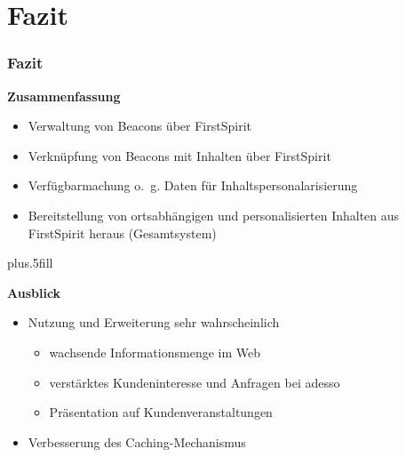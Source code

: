 \documentclass{beamer}
\begin{document}

\section[Fazit]{Fazit}

\begin{frame}
\frametitle<presentation>{Fazit}

{\textbf{Zusammenfassung}}

\begin{itemize}
\item Verwaltung von Beacons über FirstSpirit
\item Verknüpfung von Beacons mit Inhalten über FirstSpirit
\item Verfügbarmachung o.~g. Daten für Inhaltspersonalarisierung
\item Bereitstellung von ortsabhängigen und personalisierten
Inhalten aus FirstSpirit heraus (Gesamtsystem)
\end{itemize}

\vskip0pt plus.5fill

{\textbf{Ausblick}}

\begin{itemize}
\item Nutzung und Erweiterung sehr wahrscheinlich
\begin{itemize}
\item wachsende Informationsmenge im Web
\item verstärktes Kundeninteresse und Anfragen bei adesso
\item Präsentation auf Kundenveranstaltungen
\end{itemize}
\item Verbesserung des Caching-Mechanismus
\end{itemize}

\end{frame}
\end{document}
